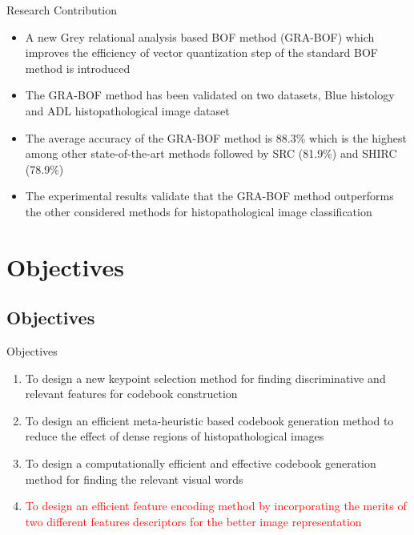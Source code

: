 \documentclass [9pt,times] {beamer}
\begin{document}
\begin{frame}{Research Contribution}

\begin{itemize}
\justifying
	\item A new Grey relational analysis based BOF method (GRA-BOF) which improves the efficiency of vector quantization step of the standard BOF method is introduced\\[3ex]
	\item The GRA-BOF method has been validated on two datasets, Blue histology and ADL histopathological image dataset\\[3ex]
	\item The average accuracy of the GRA-BOF method is 88.3\% which is the highest among other state-of-the-art methods followed by SRC (81.9\%) and SHIRC (78.9\%)\\[3ex]
	\item The experimental results validate that the GRA-BOF method outperforms the other considered methods for histopathological image classification
\end{itemize}
\end{frame}


\section*{Objectives}
\subsection{Objectives}
\begin{frame}{Objectives}
\begin{enumerate}
	\justifying
	\item To design a new keypoint selection method for finding discriminative and relevant features for codebook construction \\[3ex]

	\item To design an efficient meta-heuristic based codebook generation method to reduce the effect of dense regions of histopathological images \\[3ex]
	
	\item To design a computationally efficient and effective codebook generation method for finding the relevant visual words \\[3ex]

	\item \textcolor{red}{To design an efficient feature encoding method by incorporating the merits of two different features descriptors for the better image representation}
	
\end{enumerate}
\end{frame}
\end{document}
